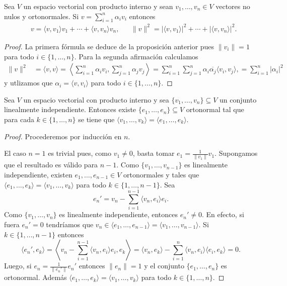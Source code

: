 \begin{cor}
	Sea $V$ un espacio vectorial con producto interno y sean $v_1,\dots,v_n\in
	V$ vectores no nulos y ortonormales. Si $v=\sum_{i=1}^n\alpha_i v_i$
	entonces
	\begin{align*}
		&v=\langle v,v_1\rangle v_1+\cdots+\langle v,v_n\rangle v_n,
		&&\|v\|^2=|\langle v,v_1\rangle|^2+\cdots+|\langle v,v_n\rangle|^2.
	\end{align*}

	\begin{proof}
		La primera fórmula se deduce de la proposición anterior pues
		$\|v_i\|=1$ para todo $i\in\{1,\dots,n\}$. Para la segunda afirmación
		calculamos
		\begin{align*}
			\|v\|^2&=\langle v,v\rangle
			=\left\langle \sum_{i=1}^n\alpha_iv_i,\sum_{j=1}^n\alpha_jv_j\right\rangle
			=\sum_{i=1}^n\sum_{j=1}^n\alpha_i\overline{\alpha_j}\langle v_i,v_j\rangle,
			=\sum_{i=1}^n|\alpha_i|^2
		\end{align*}
		y utlizamos que $\alpha_i=\langle v,v_i\rangle$ para todo
		$i\in\{1,\dots,n\}$. 
	\end{proof}
\end{cor}


\begin{thm}
	Sea $V$ un espacio vectorial con producto interno y sea
	$\{v_1,\dots,v_n\}\subseteq V$ un conjunto linealmente independiente.
	Entonces existe $\{e_1,\dots,e_n\}\subseteq V$ ortonormal tal que para cada
	$k\in\{1,\dots,n\}$ se tiene que $\langle v_1,\dots,v_k\rangle=\langle
	e_1,\dots,e_k\rangle$.
\end{thm}

\begin{proof}
	Procederemos por inducción en $n$. 

	El caso $n=1$ es trivial pues, como
	$v_1\ne0$, basta tomar $e_1=\frac1{\|v_1\|}{v_1}$. Supongamos que
	el resultado es válido para $n-1$. Como $\{v_1,\dots,v_{n-1}\}$ es
	linealmente independiente, existen $e_1,\dots,e_{n-1}\in V$ ortonormales y
	tales que $\langle e_1,\dots,e_k\rangle=\langle v_1,\dots,v_k\rangle$ para
	todo $k\in\{1,\dots,n-1\}$. Sea
	\[
		e_n'=v_n-\sum_{i=1}^{n-1}\langle v_n,e_i\rangle e_i.
	\]
	Como $\{v_1,\dots,v_n\}$ es linealmente independiente, entonces $e_n'\ne0$.
	En efecto, si fuera $e_n'=0$ tendríamos que $v_n\in\langle
	e_1,\dots,e_{n-1}\rangle=\langle v_1,\dots,v_{n-1}\rangle$. Si $k\in\{1,\dots,n-1\}$ entonces
	\[
	\langle e_n',e_k\rangle=\left\langle v_n-\sum_{i=1}^{n-1}\langle v_n,e_i\rangle e_i,e_k\right\rangle
	=\langle v_n,e_k\rangle-\sum_{i=1}^n\langle v_n,e_i\rangle\langle e_i,e_k\rangle=0.
	\]
	Luego, si $e_n=\frac1{\|e_n'\|}e_n'$ entonces $\|e_n\|=1$ y el conjunto
	$\{e_1,\dots,e_n\}$ es ortonormal. Además $\langle
	e_1,\dots,e_k\rangle=\langle v_1,\dots,v_k\rangle$ para todo
	$k\in\{1,\dots,n\}$. 
\end{proof}

